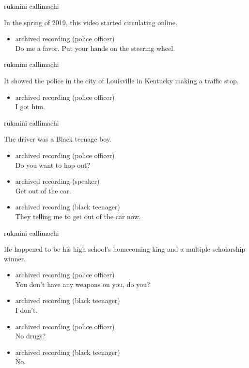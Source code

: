 rukmini callimachi

In the spring of 2019, this video started circulating online.

\begin{itemize}
\tightlist
\item
  archived recording (police officer)\\
  Do me a favor. Put your hands on the steering wheel.
\end{itemize}

rukmini callimachi

It showed the police in the city of Louisville in Kentucky making a
traffic stop.

\begin{itemize}
\tightlist
\item
  archived recording (police officer)\\
  I got him.
\end{itemize}

rukmini callimachi

The driver was a Black teenage boy.

\begin{itemize}
\item
  archived recording (police officer)\\
  Do you want to hop out?
\item
  archived recording (speaker)\\
  Get out of the car.
\item
  archived recording (black teenager)\\
  They telling me to get out of the car now.
\end{itemize}

rukmini callimachi

He happened to be his high school's homecoming king and a multiple
scholarship winner.

\begin{itemize}
\item
  archived recording (police officer)\\
  You don't have any weapons on you, do you?
\item
  archived recording (black teenager)\\
  I don't.
\item
  archived recording (police officer)\\
  No drugs?
\item
  archived recording (black teenager)\\
  No.
\end{itemize}

